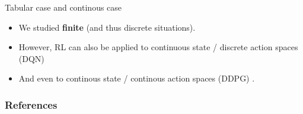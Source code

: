 \documentclass[usenames,dvipsnames,french]{beamer}
\begin{document}
\begin{frame}{Tabular case and continous case}
   \begin{itemize}
       \item We studied \textbf{{finite}} (and thus discrete situations).
        \item However, RL can also be applied to continuous state / discrete
            action spaces (DQN) 
        \item And even to continous state / continous action spaces (DDPG)
            \cite{Bengio2009} .
   \end{itemize} 
\end{frame}




\begin{frame}[allowframebreaks]
\frametitle{References}

 
\end{frame}
\end{document}

